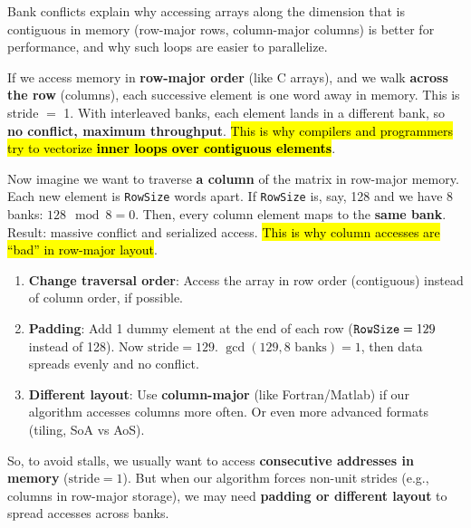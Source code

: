 \highspace
\begin{examplebox}
    Bank conflicts explain why accessing arrays along the dimension that is contiguous in memory (row-major rows, column-major columns) is better for performance, and why such loops are easier to parallelize.

    \highspace
     If we access memory in \textbf{row-major order} (like C arrays), and we walk \textbf{across the row} (columns), each successive element is one word away in memory. This is stride $=$ 1. With interleaved banks, each element lands in a different bank, so \textbf{no conflict, maximum throughput}. \hl{This is why compilers and programmers try to vectorize \textbf{inner loops over contiguous elements}}.

    \highspace
     Now imagine we want to traverse \textbf{a column} of the matrix in row-major memory. Each new element is \texttt{RowSize} words apart. If \texttt{RowSize} is, say, 128 and we have 8 banks: $128 \mod 8 = 0$. Then, every column element maps to the \textbf{same bank}. Result: massive conflict and serialized access. \hl{This is why column accesses are ``bad'' in row-major layout}.

    \highspace
    \begin{enumerate}
        \item \textbf{Change traversal order}: Access the array in row order (contiguous) instead of column order, if possible.
        
        \newpage

        \item \textbf{Padding}: Add 1 dummy element at the end of each row ($\texttt{RowSize}\break = 129$ instead of 128). Now $\text{stride} = 129$. $\gcd\left(129, 8\text{ banks}\right) = 1$, then data spreads evenly and no conflict.
        \item \textbf{Different layout}: Use \textbf{column-major} (like Fortran/Matlab) if our algorithm accesses columns more often. Or even more advanced formats (tiling, SoA vs AoS).
    \end{enumerate}
    So, to avoid stalls, we usually want to access \textbf{consecutive addresses in memory} ($\text{stride} = 1$). But when our algorithm forces non-unit strides (e.g., columns in row-major storage), we may need \textbf{padding or different layout} to spread accesses across banks.
\end{examplebox}